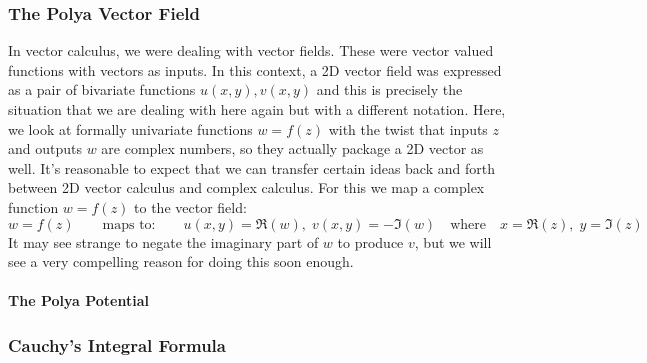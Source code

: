 


\subsubsection{The Polya Vector Field}
In vector calculus, we were dealing with vector fields. These were vector valued functions with vectors as inputs. In this context, a 2D vector field was expressed as a pair of bivariate functions $u(x,y), v(x,y)$ and this is precisely the situation that we are dealing with here again but with a different notation. Here, we look at formally univariate functions $w = f(z)$ with the twist that inputs $z$ and outputs $w$ are complex numbers, so they actually package a 2D vector as well. It's reasonable to expect that we can transfer certain ideas back and forth between 2D vector calculus and complex calculus. For this we map a complex function $w = f(z)$ to the vector field:
\begin{equation}
w = f(z)
\qquad \text{maps to:} \qquad
u(x,y) = \Re(w), \; v(x,y) = -\Im(w)
\quad \text{where} \quad
x = \Re(z), \; y = \Im(z)
\end{equation}
It may see strange to negate the imaginary part of $w$ to produce $v$, but we will see a very compelling reason for doing this soon enough. 






\paragraph{The Polya Potential}




\subsubsection{Cauchy's Integral Formula}


